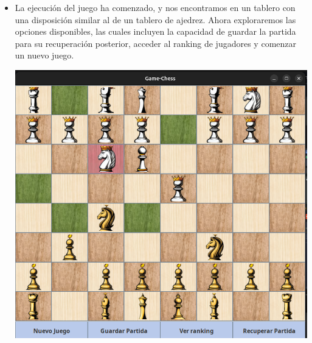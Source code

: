 \documentclass{article}
\begin{document}
\begin{itemize}
\item La ejecución del juego ha comenzado, y nos encontramos en un tablero con una disposición similar al de un tablero de ajedrez. Ahora exploraremos las opciones disponibles, las cuales incluyen la capacidad de guardar la partida para su recuperación posterior, acceder al ranking de jugadores y comenzar un nuevo juego.
\begin{center}
    \includegraphics[width=16cm]{latex/img/3.png}
\end{center}


\end{itemize}
\end{document}

